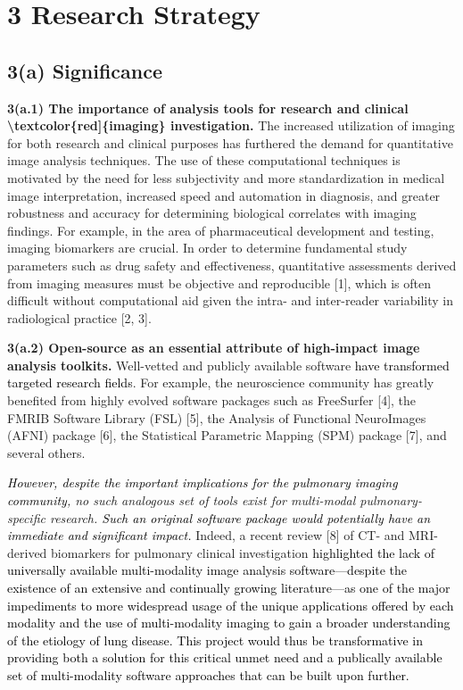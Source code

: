 \documentclass[11pt,]{article}
\begin{document}
\newpage

\section{3 Research Strategy}\label{research-strategy}

\subsection{\texorpdfstring{\textbf{3(a)
Significance}}{3(a) Significance}}\label{a-significance}

\textbf{3(a.1) The importance of analysis tools for research and
clinical \textbackslash{}textcolor\{red{]}\{imaging\} investigation.}
The increased utilization of imaging for both research and clinical
purposes has furthered the demand for quantitative image analysis
techniques. The use of these computational techniques is motivated by
the need for less subjectivity and more standardization in medical image
interpretation, increased speed and automation in diagnosis, and greater
robustness and accuracy for determining biological correlates with
imaging findings. For example, in the area of pharmaceutical development
and testing, imaging biomarkers are crucial. In order to determine
fundamental study parameters such as drug safety and effectiveness,
quantitative assessments derived from imaging measures must be objective
and reproducible {[}1{]}, which is often difficult without computational
aid given the intra- and inter-reader variability in radiological
practice {[}2, 3{]}.

\textbf{3(a.2) Open-source as an essential attribute of high-impact
image analysis toolkits.} Well-vetted and publicly available software
\textcolor{black}{have transformed targeted research fields}. For
example, the neuroscience community has greatly benefited from highly
evolved software packages such as FreeSurfer {[}4{]}, the FMRIB Software
Library (FSL) {[}5{]}, the Analysis of Functional NeuroImages (AFNI)
package {[}6{]}, the Statistical Parametric Mapping (SPM) package
{[}7{]}, and several others.

\emph{\textcolor{black}{However, despite the important implications for the pulmonary imaging
community}, no such analogous set of tools exist for multi-modal
pulmonary-specific research.
\textcolor{black}{Such an original software package would potentially have an immediate and
significant impact.}} Indeed, a recent review {[}8{]} of CT- and
MRI-derived biomarkers for pulmonary clinical investigation
\textcolor{black}{
highlighted the lack of universally available multi-modality image
analysis software---despite the existence of an extensive and continually
growing literature---as one of the major impediments to more widespread
usage of the unique applications offered by each modality and the use of
multi-modality imaging to gain a broader understanding of the etiology
of lung disease. This project would thus be transformative in providing
both a solution for this critical unmet need and a publically available
set of multi-modality software approaches that can be built upon further.}
\end{document}
